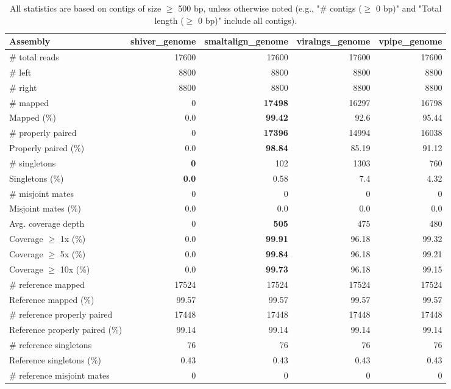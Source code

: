 \documentclass[12pt,a4paper]{article}
\begin{document}
\begin{table}[ht]
\begin{center}
\caption{All statistics are based on contigs of size $\geq$ 500 bp, unless otherwise noted (e.g., "\# contigs ($\geq$ 0 bp)" and "Total length ($\geq$ 0 bp)" include all contigs).}
\begin{tabular}{|l*{4}{|r}|}
\hline
Assembly & shiver\_genome & smaltalign\_genome & viralngs\_genome & vpipe\_genome \\ \hline
\# total reads & 17600 & 17600 & 17600 & 17600 \\ \hline
\# left & 8800 & 8800 & 8800 & 8800 \\ \hline
\# right & 8800 & 8800 & 8800 & 8800 \\ \hline
\# mapped & 0 & {\bf 17498} & 16297 & 16798 \\ \hline
Mapped (\%) & 0.0 & {\bf 99.42} & 92.6 & 95.44 \\ \hline
\# properly paired & 0 & {\bf 17396} & 14994 & 16038 \\ \hline
Properly paired (\%) & 0.0 & {\bf 98.84} & 85.19 & 91.12 \\ \hline
\# singletons & {\bf 0} & 102 & 1303 & 760 \\ \hline
Singletons (\%) & {\bf 0.0} & 0.58 & 7.4 & 4.32 \\ \hline
\# misjoint mates & 0 & 0 & 0 & 0 \\ \hline
Misjoint mates (\%) & 0.0 & 0.0 & 0.0 & 0.0 \\ \hline
Avg. coverage depth & 0 & {\bf 505} & 475 & 480 \\ \hline
Coverage $\geq$ 1x (\%) & 0.0 & {\bf 99.91} & 96.18 & 99.32 \\ \hline
Coverage $\geq$ 5x (\%) & 0.0 & {\bf 99.84} & 96.18 & 99.21 \\ \hline
Coverage $\geq$ 10x (\%) & 0.0 & {\bf 99.73} & 96.18 & 99.15 \\ \hline
\# reference mapped & 17524 & 17524 & 17524 & 17524 \\ \hline
Reference mapped (\%) & 99.57 & 99.57 & 99.57 & 99.57 \\ \hline
\# reference properly paired & 17448 & 17448 & 17448 & 17448 \\ \hline
Reference properly paired (\%) & 99.14 & 99.14 & 99.14 & 99.14 \\ \hline
\# reference singletons & 76 & 76 & 76 & 76 \\ \hline
Reference singletons (\%) & 0.43 & 0.43 & 0.43 & 0.43 \\ \hline
\# reference misjoint mates & 0 & 0 & 0 & 0 \\ \hline

\end{tabular}
\end{center}
\end{table}
\end{document}
